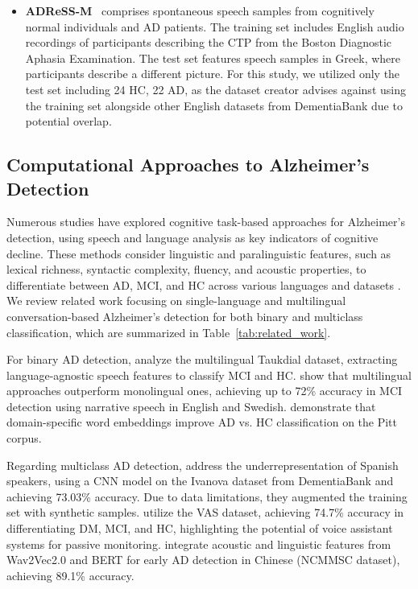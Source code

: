 \begin{itemize}
    \item \textbf{ADReSS-M}~\cite{luz2023multilingual} comprises spontaneous speech samples from cognitively normal individuals and AD patients. The training set includes English audio recordings of participants describing the CTP from the Boston Diagnostic Aphasia Examination. The test set features speech samples in Greek, where participants describe a different picture. For this study, we utilized only the test set including 24 HC, 22 AD, as the dataset creator advises against using the training set alongside other English datasets from DementiaBank due to potential overlap.
\end{itemize}


\subsection{Computational Approaches to Alzheimer's Detection}

Numerous studies have explored cognitive task-based approaches for Alzheimer’s detection, using speech and language analysis as key indicators of cognitive decline. These methods consider linguistic and paralinguistic features, such as lexical richness, syntactic complexity, fluency, and acoustic properties, to differentiate between AD, MCI, and HC across various languages and datasets \cite{shakeri2025natural}. We review related work focusing on single-language and multilingual conversation-based Alzheimer’s detection for both binary and multiclass classification, which are summarized in Table~\ref{tab:related_work}.


For binary AD detection, \citet{duan2024pre} analyze the multilingual Taukdial dataset, extracting language-agnostic speech features to classify MCI and HC. \citet{fraser2019multilingual} show that multilingual approaches outperform monolingual ones, achieving up to 72\% accuracy in MCI detection using narrative speech in English and Swedish. \citet{jain2021exploring} demonstrate that domain-specific word embeddings improve AD vs. HC classification on the Pitt corpus.

Regarding multiclass AD detection, \citet{orozco2024automatic} address the underrepresentation of Spanish speakers, using a CNN model on the Ivanova dataset from DementiaBank and achieving 73.03\% accuracy. Due to data limitations, they augmented the training set with synthetic samples. \citet{kurtz2023early} utilize the VAS dataset, achieving 74.7\% accuracy in differentiating DM, MCI, and HC, highlighting the potential of voice assistant systems for passive monitoring. \citet{ying2023multimodal} integrate acoustic and linguistic features from Wav2Vec2.0 and BERT for early AD detection in Chinese (NCMMSC dataset), achieving 89.1\% accuracy.




